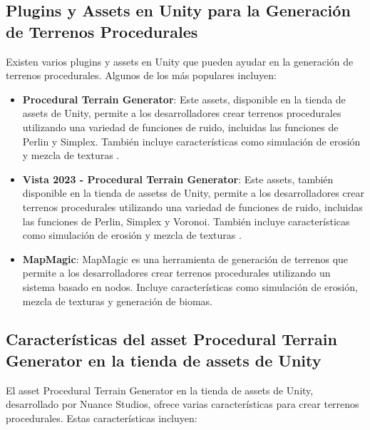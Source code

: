\subsection{Plugins y Assets en Unity para la Generación de Terrenos Procedurales}

Existen varios plugins y assets en Unity que pueden ayudar en la generación de terrenos procedurales. Algunos de los más populares incluyen:

\begin{itemize}
    \item \textbf{Procedural Terrain Generator}: Este assets, disponible en la tienda de assets de Unity, permite a los desarrolladores crear terrenos procedurales utilizando una variedad de funciones de ruido, incluidas las funciones de Perlin y Simplex. También incluye características como simulación de erosión y mezcla de texturas \cite{ProceduralTerrainGenerator}.
    
    \item \textbf{Vista 2023 - Procedural Terrain Generator}: Este assets, también disponible en la tienda de assetss de Unity, permite a los desarrolladores crear terrenos procedurales utilizando una variedad de funciones de ruido, incluidas las funciones de Perlin, Simplex y Voronoi. También incluye características como simulación de erosión y mezcla de texturas \cite{Vista2023TerrainGenerator}.
    
    \item \textbf{MapMagic}: MapMagic es una herramienta de generación de terrenos que permite a los desarrolladores crear terrenos procedurales utilizando un sistema basado en nodos. Incluye características como simulación de erosión, mezcla de texturas y generación de biomas\cite{MapMagicTerrain}.
    
\end{itemize}

\subsection{Características del asset Procedural Terrain Generator en la tienda de assets de Unity}

El asset Procedural Terrain Generator en la tienda de assets de Unity, desarrollado por Nuance Studios, ofrece varias características para crear terrenos procedurales. Estas características incluyen:

